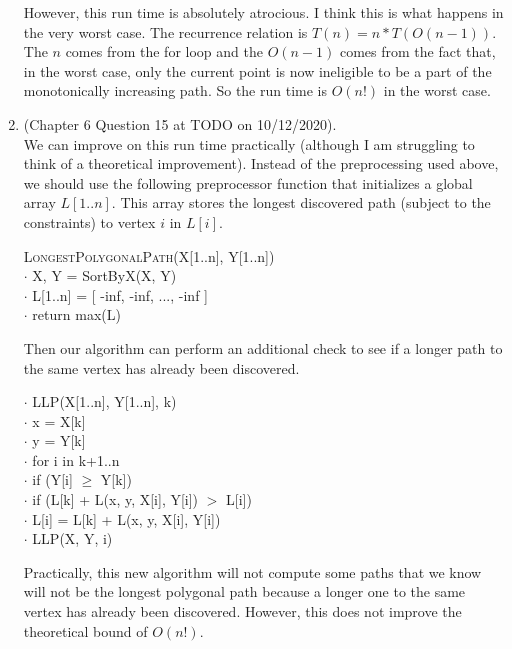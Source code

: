 \documentclass{article}
\begin{document}
\begin{enumerate}
        However, this run time is absolutely atrocious. I think this is what happens in the very worst case. The recurrence relation is $T(n) = n * T(O(n-1))$. The $n$ comes from the for loop and the $O(n-1)$ comes from the fact that, in the worst case, only the current point is now ineligible to be a part of the monotonically increasing path. So the run time is $O(n!)$ in the worst case.
    \item (Chapter 6 Question 15 at TODO on 10/12/2020). \\
        We can improve on this run time practically (although I am struggling to think of a theoretical improvement).
        Instead of the preprocessing used above, we should use the following preprocessor function that initializes a global array $L[1..n]$.
        This array stores the longest discovered path (subject to the constraints) to vertex $i$ in $L[i]$.

        \begin{algorithm}
        \textsc{LongestPolygonalPath}(X[1..n], Y[1..n]) \\
            $\cdot$ \hspace{1em} X, Y = SortByX(X, Y) \\
            $\cdot$ \hspace{1em} L[1..n] = [ -inf, -inf, ..., -inf ] \\
            $\cdot$ \hspace{1em} return max(L)
        \end{algorithm}

        Then our algorithm can perform an additional check to see if a longer path to the same vertex has already been discovered.

        \begin{algorithm}
            $\cdot$ \hspace{1em} LLP(X[1..n], Y[1..n], k) \\
            $\cdot$ \hspace{1em} x = X[k] \\
            $\cdot$ \hspace{1em} y = Y[k] \\
            $\cdot$ \hspace{1em} for i in k+1..n \\
            $\cdot$ \hspace{2em} if (Y[i] $\geq$ Y[k]) \\
            $\cdot$ \hspace{3em} if (L[k] + L(x, y, X[i], Y[i]) $>$ L[i]) \\
            $\cdot$ \hspace{4em} L[i] = L[k] + L(x, y, X[i], Y[i]) \\
            $\cdot$ \hspace{4em} LLP(X, Y, i)
        \end{algorithm}

        Practically, this new algorithm will not compute some paths that we know will not be the longest polygonal path because a longer one to the same vertex has already been discovered.
        However, this does not improve the theoretical bound of $O(n!)$.
\end{enumerate}
\end{document}
